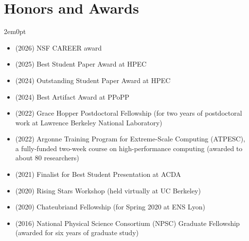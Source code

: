 \section{Honors and Awards}
\begin{adjustwidth}{2em}{0pt}

\begin{itemize}
\item (2026) NSF CAREER award
    \item (2025) Best Student Paper Award at HPEC
    \item (2024) Outstanding Student Paper Award at HPEC
    \item (2024) Best Artifact Award at PPoPP
    \item (2022) Grace Hopper Postdoctoral Fellowship (for two years of
    postdoctoral work at Lawrence Berkeley National Laboratory)
    \item (2022) Argonne Training Program for Extreme-Scale Computing (ATPESC), a fully-funded two-week course on high-performance computing (awarded to about 80 researchers)
    \item (2021) Finalist for Best Student Presentation at ACDA
    \item (2020) Rising Stars Workshop (held virtually at UC Berkeley)
    \item (2020) Chateubriand Fellowship (for Spring 2020 at ENS Lyon)
    \item (2016) National Physical Science Consortium (NPSC) Graduate Fellowship
  (awarded for six years of graduate study)
\end{itemize}

\end{adjustwidth}

